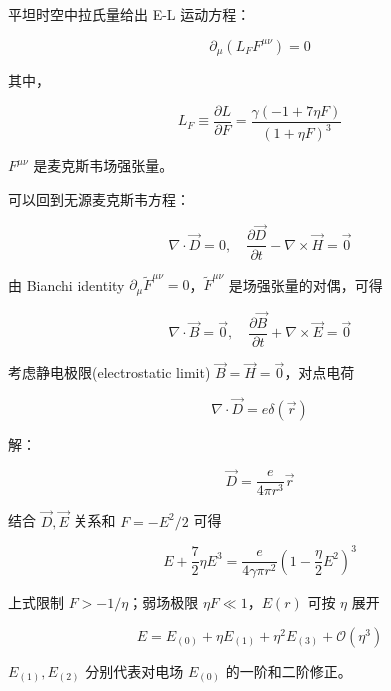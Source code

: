 \documentclass[9pt, dvipsnames]{beamer} %
\begin{document}
\begin{frame}
    平坦时空中拉氏量给出 E-L 运动方程：

    $$
    \partial_\mu\left(L_F F^{\mu\nu} \right) = 0
    $$
    
    其中，
    
    $$
    L_F
    \equiv \frac{\partial L }{\partial F } 
    =\frac{\gamma(-1+7\eta F) }{(1+\eta F)^3 }
    $$
    
    $F^{\mu \nu} $ 是麦克斯韦场强张量。

    可以回到无源麦克斯韦方程：

    $$
    \nabla\cdot\vec{D} = 0,\quad
    \frac{\partial \vec{D} }{\partial t } - \nabla\times\vec{H}= \vec{0} 
    $$
    
    由 Bianchi identity $\partial_\mu \tilde{F}^{\mu \nu}=0 $，$\tilde{F}^{\mu\nu} $ 是场强张量的对偶，可得
    
    $$
    \nabla\cdot\vec{B} = \vec{0},\quad 
    \frac{\partial \vec{B} }{\partial t } + \nabla\times\vec{E} = \vec{0} 
    $$    
\end{frame}

\begin{frame}
    考虑静电极限(electrostatic limit) $\vec{B}=\vec{H}=\vec{0} $，对点电荷

    $$
    \nabla\cdot\vec{D} = e\delta(\vec{r})
    $$
    
    解：
    
    $$
    \vec{D}
    =\frac{e }{4\pi r^3 } \vec{r}
    $$
    
    结合 $\vec{D},\vec{E} $ 关系和 $F=-E^2/2 $ 可得
    
    $$
    E+\frac{7 }{2 } \eta E^3
    =\frac{e }{4\gamma \pi r^2 } \left(1-\frac{\eta  }{2 } E^2 \right)^3 
    $$
    
    上式限制 $F>-1/\eta $；弱场极限 $\eta F\ll 1 $，$E(r) $ 可按 $\eta $ 展开
    
    $$
    E
    =E_{(0)} + \eta E_{(1)} + \eta^2 E_{(3)} + \mathcal{O}\left(\eta^3 \right)
    $$
    
    $E_{(1)},E_{(2)} $ 分别代表对电场 $E_{(0)} $ 的一阶和二阶修正。
\end{frame}
\end{document}
